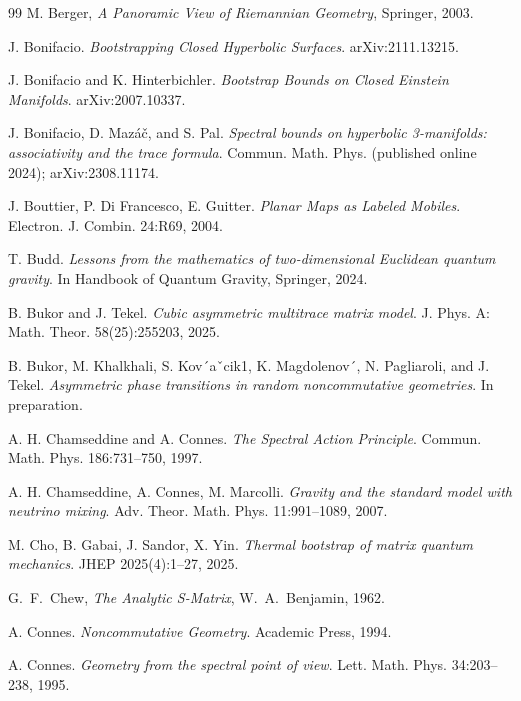 \documentclass[11pt]{article}
\theoremstyle{plain}
\begin{document}
\begin{thebibliography}{99}
M. Berger, \emph{A Panoramic View of Riemannian Geometry}, Springer, 2003.





J. Bonifacio. \emph{Bootstrapping Closed Hyperbolic Surfaces}. arXiv:2111.13215.

J. Bonifacio and K. Hinterbichler. \emph{Bootstrap Bounds on Closed Einstein Manifolds}. arXiv:2007.10337.



 J. Bonifacio, D. Mazáč, and S. Pal.
\emph{Spectral bounds on hyperbolic 3-manifolds: associativity and the trace formula}.
Commun. Math. Phys. (published online 2024); arXiv:2308.11174.





J. Bouttier, P. Di Francesco, E. Guitter. \emph{Planar Maps as Labeled Mobiles}.
Electron. J. Combin. 24:R69, 2004.

T. Budd. \emph{Lessons from the mathematics of two-dimensional Euclidean quantum gravity}. In Handbook of Quantum Gravity, Springer, 2024.

B. Bukor and J. Tekel. \emph{Cubic asymmetric multitrace matrix model}. J. Phys. A: Math. Theor. 58(25):255203, 2025.

B. Bukor, M. Khalkhali, S. Kov´aˇcik1, K. Magdolenov´,
N. Pagliaroli, and J. Tekel. \emph{Asymmetric phase transitions in random noncommutative geometries}. In preparation.



A. H. Chamseddine and A. Connes. \emph{The Spectral Action Principle}. Commun. Math. Phys. 186:731–750, 1997.

A. H. Chamseddine,  A. Connes, M. Marcolli. \emph{Gravity and the standard model with neutrino mixing}. Adv. Theor. Math. Phys. 11:991–1089, 2007.

M. Cho, B. Gabai, J. Sandor, X. Yin. \emph{Thermal bootstrap of matrix quantum mechanics}. JHEP 2025(4):1–27, 2025.

G.~F.~Chew, \emph{The Analytic S-Matrix}, W.~A.~Benjamin, 1962.

A. Connes. \emph{Noncommutative Geometry}. Academic Press, 1994.

A. Connes. \emph{Geometry from the spectral point of view}. Lett. Math. Phys. 34:203–238, 1995.


\end{thebibliography}
\end{document}
